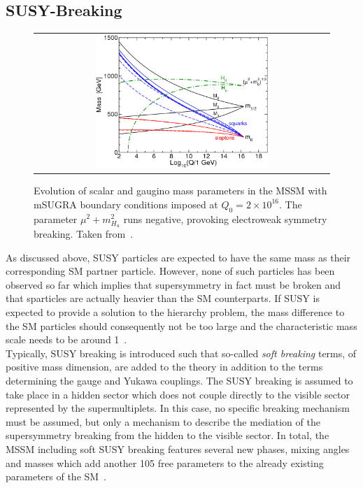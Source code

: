 \subsection{SUSY-Breaking}
\label{subsec:susy_breaking}
\begin{figure}[!t]
  \centering 
  \begin{tabular}{c}
    \includegraphics[width=0.6\textwidth]{figures/MSSMrun.png}
  \end{tabular}
  \caption{Evolution of scalar and gaugino mass parameters in the MSSM with mSUGRA boundary conditions imposed at $Q_0 = 2 \times 10^{16}$\gev. The parameter $\mu^2 + m^2_{H_{u}}$ runs negative, provoking electroweak symmetry breaking. Taken from~\cite{Martin:1997ns}.}
  \label{fig:MSSMrun}
\end{figure}
As discussed above, SUSY particles are expected to have the same mass as their corresponding SM partner particle. However, none of such particles has been observed so far which implies that supersymmetry in fact must be broken and that sparticles are actually heavier than the SM counterparts. If SUSY is expected to provide a solution to the hierarchy problem, the mass difference to the SM particles should consequently not be too large and the characteristic mass scale needs to be around 1\tev~\cite{Martin:1997ns}. \\
Typically, SUSY breaking is introduced such that so-called \textit{soft breaking} terms, \ie of positive mass dimension, are added to the theory in addition to the terms determining the gauge and Yukawa couplings. The SUSY breaking is assumed to take place in a hidden sector which does not couple directly to the visible sector represented by the supermultiplets. In this case, no specific breaking mechanism must be assumed, but only a mechanism to describe the mediation of the supersymmetry breaking from the hidden to the visible sector. In total, the MSSM including soft SUSY breaking features several new phases, mixing angles and masses which add another 105 free parameters to the already existing parameters of the SM~\cite{Dimopoulos:1995ju}.  \\
